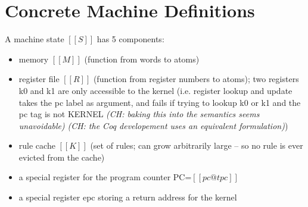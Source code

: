 \documentclass{article}
\newcommand{\ch}[1]{{\color{dkblue}\em (CH: #1)}}
\newcommand{\apt}[1]{{\color{red}\em (APT: #1)}}
\begin{document}

\section{Concrete Machine Definitions}

A machine state $[[S]]$ has 5 components:
\begin{itemize}
\item memory $[[M]]$ (function from words to atoms)
\item register file $[[R]]$ (function from register numbers to atoms);
  two registers k0 and k1 are only accessible to the kernel
  (i.e. register lookup and update takes the pc label as argument, and
  fails if trying to lookup k0 or k1 and the pc tag is not KERNEL
  \ch{baking this into the semantics seems unavoidable}
  \ch{the Coq developement uses an equivalent formulation})
\item rule cache $[[K]]$ (set of rules; can grow arbitrarily large --
  so no rule is ever evicted from the cache)
\item a special register for the program counter PC=$[[pc@tpc]]$
\item a special register epc storing a return address for the kernel 
\end{itemize}
\end{document}
